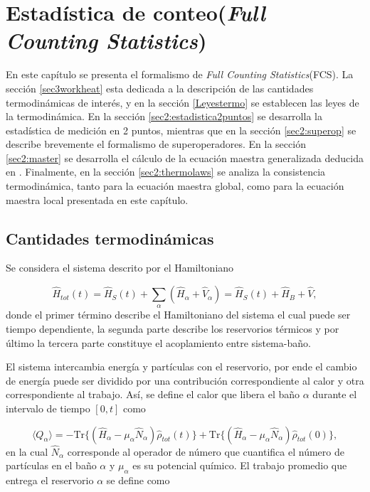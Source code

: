 \label{sec:lindblad}


\chapter{Estadística de conteo(\textit{Full Counting Statistics}) }
En este capítulo se presenta el formalismo de \textit{Full Counting Statistics}(FCS). La sección \ref{sec3workheat} esta dedicada a la  descripción de las cantidades termodinámicas de interés, y en la sección \ref{Leyestermo} se establecen las leyes de la termodinámica. En la sección \ref{sec2:estadistica2puntos} se desarrolla la estadística de medición en 2 puntos, mientras que en la sección \ref{sec2:superop} se describe brevemente el formalismo de superoperadores. En la sección \ref{sec2:master} se desarrolla el cálculo de la ecuación maestra generalizada deducida en \cite{potts2021thermodynamically}. Finalmente, en la sección \ref{sec2:thermolaws} se analiza la consistencia termodinámica, tanto para la ecuación maestra global, como para la ecuación maestra local presentada en este capítulo. 

\section{Cantidades termodinámicas}
Se considera el sistema descrito por el Hamiltoniano

\begin{equation*}
    \hat{H}_{tot}(t) = \hat{H}_{S}(t) + \sum_{\alpha}(\hat{H}_{\alpha} + \hat{V}_{\alpha})  = \hat{H}_{S}(t) + \hat{H}_{B} + \hat{V},
\end{equation*}
donde el primer término describe el Hamiltoniano del sistema el cual puede ser tiempo dependiente, la segunda parte describe los reservorios térmicos y por último la tercera parte constituye el acoplamiento entre sistema-baño.

El sistema intercambia energía y partículas con el reservorio, por ende el cambio de energía puede ser dividido por una contribución correspondiente al calor y otra correspondiente al trabajo. Así, se define el calor que libera el baño $\alpha$ durante el intervalo de tiempo $[0,t]$ como

\begin{equation}
    \langle Q_{\alpha}\rangle = - \text{Tr}\{(\hat{H}_{\alpha} - \mu_{\alpha}\hat{N}_{\alpha})\hat{\rho}_{tot}(t) \} + \text{Tr}\{(\hat{H}_{\alpha} - \mu_{\alpha}\hat{N}_{\alpha})\hat{\rho}_{tot}(0) \},
\label{sec3:calor}
\end{equation}
en la cual $\hat{N}_{\alpha}$ corresponde al operador de número que cuantifica el número de partículas en el baño $\alpha$ y $\mu_{\alpha}$ es su potencial químico. El trabajo promedio que entrega el reservorio $\alpha$ se define como

